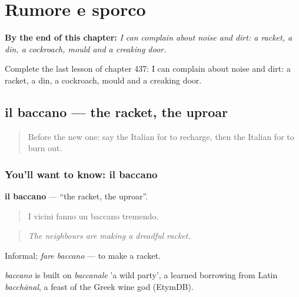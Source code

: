 
\chapter{Rumore e sporco}
\label{ch:it-rumore-e-sporco}

\begin{chapteropening}
\textbf{By the end of this chapter:} \emph{I can complain about noise and dirt: a racket, a din, a cockroach, mould and a creaking door.}

Complete the last lesson of chapter 437: I can complain about noise and dirt: a racket, a din, a cockroach, mould and a creaking door.
\end{chapteropening}

\section[il baccano]{il baccano — the racket, the uproar}

\label{lesson:IT-C437-baccano}



\begin{quote}
Before the new one: say the Italian for to recharge, then the Italian for to burn out.
\end{quote}

\subsection*{You'll want to know: il baccano}
\textbf{il baccano} — \textquotedblleft{}the racket, the uproar\textquotedblright{}.

\begin{quote}
I vicini fanno un baccano tremendo.
\end{quote}

\begin{quote}
\emph{The neighbours are making a dreadful racket.}
\end{quote}

Informal; \emph{fare baccano} — to make a racket.

\begin{cousinweb}
\emph{baccano} is built on \emph{baccanale} 'a wild party', a learned borrowing from Latin \emph{bacchānal}, a feast of the Greek wine god (EtymDB).
\end{cousinweb}

